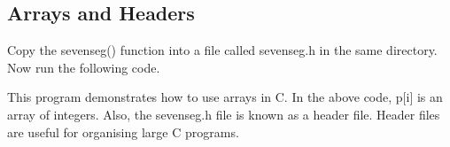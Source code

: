 \documentclass[journal,12pt,twocolumn]{IEEEtran}
\begin{document}
\subsection{Arrays and Headers}
%
\begin{problem}
Copy the sevenseg() function into a file called sevenseg.h in the same directory.  Now run the following code.
\end{problem}
%
\solution

This program demonstrates how to use arrays in C.  In the above code, p[i] is an array of integers.  Also, the sevenseg.h file is known as a header file.  Header files are useful for organising large C programs.
%
%
%
%

%
\end{document}
